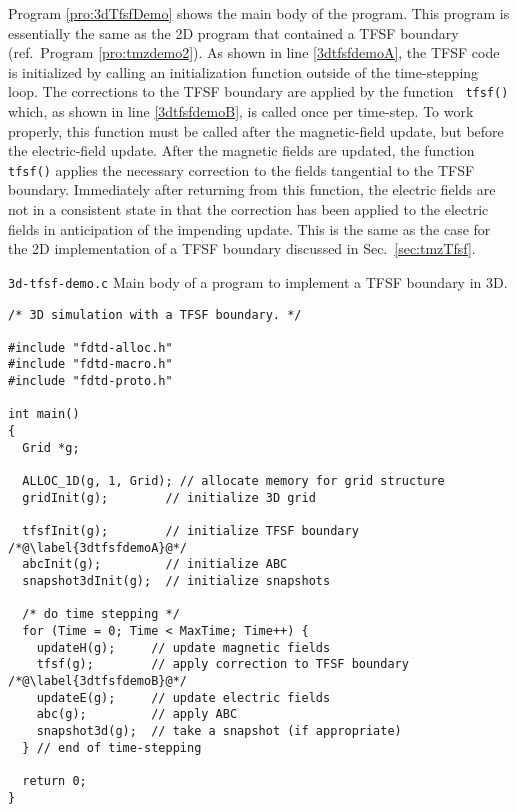 Program \ref{pro:3dTfsfDemo} shows the main body of the program.  This
program is essentially the same as the 2D program that contained a
TFSF boundary (ref.\ Program \ref{pro:tmzdemo2}).  As shown in line
\ref{3dtfsfdemoA}, the TFSF code is initialized by calling an
initialization function outside of the time-stepping loop.  The
corrections to the TFSF boundary are applied by the function {\tt
tfsf()} which, as shown in line
\ref{3dtfsfdemoB}, is called once per time-step.  To work properly,
this function must be called after the magnetic-field update, but
before the electric-field update.  After the magnetic fields are
updated, the function {\tt tfsf()} applies the necessary correction to
the fields tangential to the TFSF boundary.  Immediately after
returning from this function, the electric fields are not in a
consistent state in that the correction has been applied to the
electric fields in anticipation of the impending update.  This is the
same as the case for the 2D implementation of a TFSF boundary
discussed in Sec.\ \ref{sec:tmzTfsf}.

\begin{program}
{\tt 3d-tfsf-demo.c} Main body of a program to implement a TFSF
boundary in 3D.
\label{pro:3dTfsfDemo}
\codemiddle
\begin{lstlisting}
/* 3D simulation with a TFSF boundary. */

#include "fdtd-alloc.h"
#include "fdtd-macro.h" 
#include "fdtd-proto.h"

int main()
{
  Grid *g;

  ALLOC_1D(g, 1, Grid); // allocate memory for grid structure
  gridInit(g);        // initialize 3D grid

  tfsfInit(g);        // initialize TFSF boundary /*@\label{3dtfsfdemoA}@*/
  abcInit(g);         // initialize ABC
  snapshot3dInit(g);  // initialize snapshots

  /* do time stepping */
  for (Time = 0; Time < MaxTime; Time++) {
    updateH(g);     // update magnetic fields 
    tfsf(g);        // apply correction to TFSF boundary /*@\label{3dtfsfdemoB}@*/
    updateE(g);     // update electric fields 
    abc(g);         // apply ABC
    snapshot3d(g);  // take a snapshot (if appropriate)
  } // end of time-stepping

  return 0;
}
\end{lstlisting}
\end{program}

